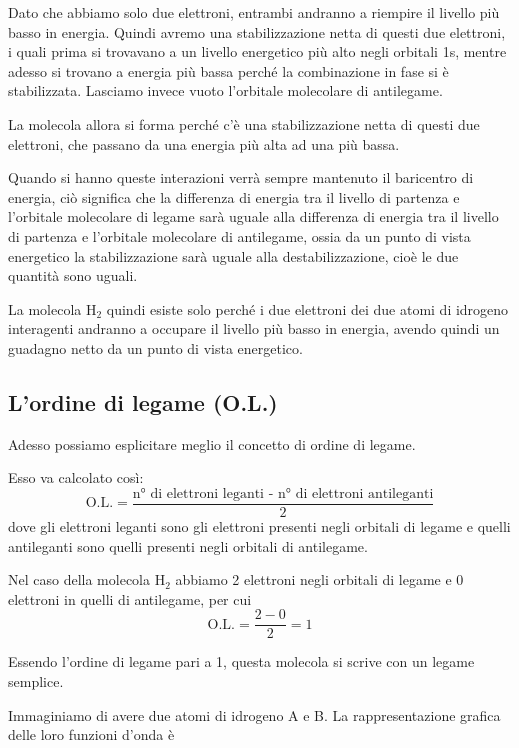 \vspace{0.2cm}Dato che abbiamo solo due elettroni, entrambi andranno a riempire il livello più basso in energia. Quindi avremo una stabilizzazione netta di questi due elettroni, i quali prima si trovavano a un livello energetico più alto negli orbitali 1s, mentre adesso si trovano a energia più bassa perché la combinazione in fase si è stabilizzata. Lasciamo invece vuoto l'orbitale molecolare di antilegame.

La molecola allora si forma perché c'è una stabilizzazione netta di questi due elettroni, che passano da una energia più alta ad una più bassa.

Quando si hanno queste interazioni verrà sempre mantenuto il baricentro di energia, ciò significa che la differenza di energia tra il livello di partenza e l'orbitale molecolare di legame sarà uguale alla differenza di energia tra il livello di partenza e l'orbitale molecolare di antilegame, ossia da un punto di vista energetico la stabilizzazione sarà uguale alla destabilizzazione, cioè le due quantità sono uguali.

La molecola H$_2$ quindi esiste solo perché i due elettroni dei due atomi di idrogeno interagenti andranno a occupare il livello più basso in energia, avendo quindi un guadagno netto da un punto di vista energetico.

\subsection{L'ordine di legame (O.L.)}
Adesso possiamo esplicitare meglio il concetto di ordine di legame.

Esso va calcolato così:
$$\text{O.L.}=\frac{\text{n° di elettroni leganti - n° di elettroni antileganti}}{2}$$
dove gli elettroni leganti sono gli elettroni presenti negli orbitali di legame e quelli antileganti sono quelli presenti negli orbitali di antilegame.

Nel caso della molecola H$_2$ abbiamo 2 elettroni negli orbitali di legame e 0 elettroni in quelli di antilegame, per cui
$$\text{O.L.}=\frac{2-0}{2}=1$$

Essendo l'ordine di legame pari a 1, questa molecola si scrive con un legame semplice.

\vspace{0.2cm}Immaginiamo di avere due atomi di idrogeno A e B. La rappresentazione grafica delle loro funzioni d'onda è


